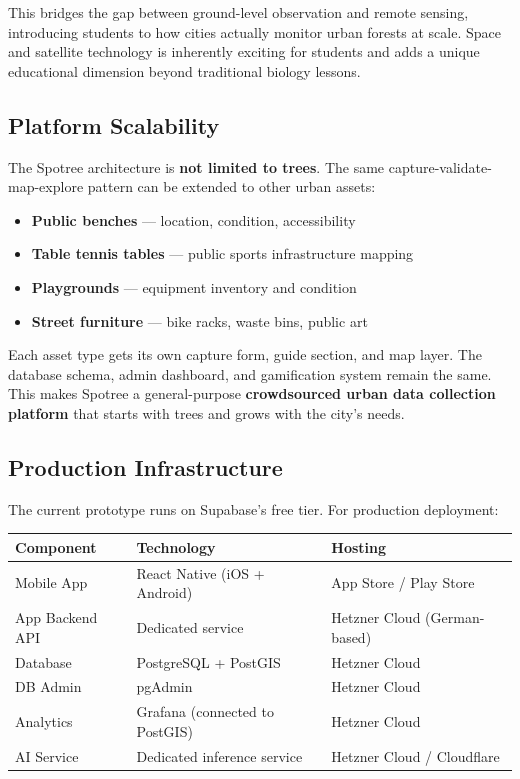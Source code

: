\documentclass[11pt,a4paper]{article}
\begin{document}
This bridges the gap between ground-level observation and remote sensing, introducing students to how cities actually monitor urban forests at scale. Space and satellite technology is inherently exciting for students and adds a unique educational dimension beyond traditional biology lessons.

\subsection{Platform Scalability}

The Spotree architecture is \textbf{not limited to trees}. The same capture-validate-map-explore pattern can be extended to other urban assets:

\begin{itemize}[nosep]
  \item \textbf{Public benches} --- location, condition, accessibility
  \item \textbf{Table tennis tables} --- public sports infrastructure mapping
  \item \textbf{Playgrounds} --- equipment inventory and condition
  \item \textbf{Street furniture} --- bike racks, waste bins, public art
\end{itemize}

Each asset type gets its own capture form, guide section, and map layer. The database schema, admin dashboard, and gamification system remain the same. This makes Spotree a general-purpose \textbf{crowdsourced urban data collection platform} that starts with trees and grows with the city's needs.

\subsection{Production Infrastructure}

The current prototype runs on Supabase's free tier. For production deployment:

\begin{center}
\begin{tabularx}{\textwidth}{l l X}
\toprule
\textbf{Component} & \textbf{Technology} & \textbf{Hosting} \\
\midrule
Mobile App & React Native (iOS + Android) & App Store / Play Store \\
App Backend API & Dedicated service & Hetzner Cloud (German-based) \\
Database & PostgreSQL + PostGIS & Hetzner Cloud \\
DB Admin & pgAdmin & Hetzner Cloud \\
Analytics & Grafana (connected to PostGIS) & Hetzner Cloud \\
AI Service & Dedicated inference service & Hetzner Cloud / Cloudflare \\
\bottomrule
\end{tabularx}
\end{center}
\end{document}
